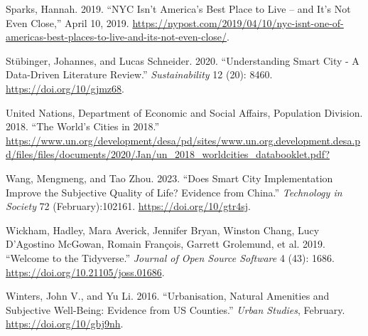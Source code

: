 \documentclass[
  english,
  12pt,
  a4paper,
]{scrartcl}
\newlength{\cslhangindent}
\newenvironment{CSLReferences}[2] %
 {\begin{list}{}{%
  \setlength{\itemindent}{0pt}
  \setlength{\leftmargin}{0pt}
  \setlength{\parsep}{0pt}
  \ifodd #1
   \setlength{\leftmargin}{\cslhangindent}
   \setlength{\itemindent}{-1\cslhangindent}
  \fi
  \setlength{\itemsep}{#2\baselineskip}}}
 {\end{list}}
\begin{document}
\begin{CSLReferences}{1}{0}
Sparks, Hannah. 2019. {``{NYC} Isn't {America}'s Best Place to Live --
and It's Not Even Close,''} April 10, 2019.
\url{https://nypost.com/2019/04/10/nyc-isnt-one-of-americas-best-places-to-live-and-its-not-even-close/}.

Stübinger, Johannes, and Lucas Schneider. 2020. {``Understanding {Smart
City} - {A} Data-Driven Literature Review.''} \emph{Sustainability} 12
(20): 8460. \url{https://doi.org/10/gjmz68}.

United Nations, Department of Economic and Social Affairs, Population
Division. 2018. {``The {World}'s Cities in 2018.''}
\url{https://www.un.org/development/desa/pd/sites/www.un.org.development.desa.pd/files/files/documents/2020/Jan/un_2018_worldcities_databooklet.pdf?}

Wang, Mengmeng, and Tao Zhou. 2023. {``Does Smart City Implementation
Improve the Subjective Quality of Life? {Evidence} from {China}.''}
\emph{Technology in Society} 72 (February):102161.
\url{https://doi.org/10/gtr4sj}.

Wickham, Hadley, Mara Averick, Jennifer Bryan, Winston Chang, Lucy
D'Agostino McGowan, Romain François, Garrett Grolemund, et al. 2019.
{``Welcome to the Tidyverse.''} \emph{Journal of Open Source Software} 4
(43): 1686. \url{https://doi.org/10.21105/joss.01686}.

Winters, John V., and Yu Li. 2016. {``Urbanisation, Natural Amenities
and Subjective Well-Being: {Evidence} from {US} Counties.''} \emph{Urban
Studies}, February. \url{https://doi.org/10/gbj9nh}.

\end{CSLReferences}
\end{document}
